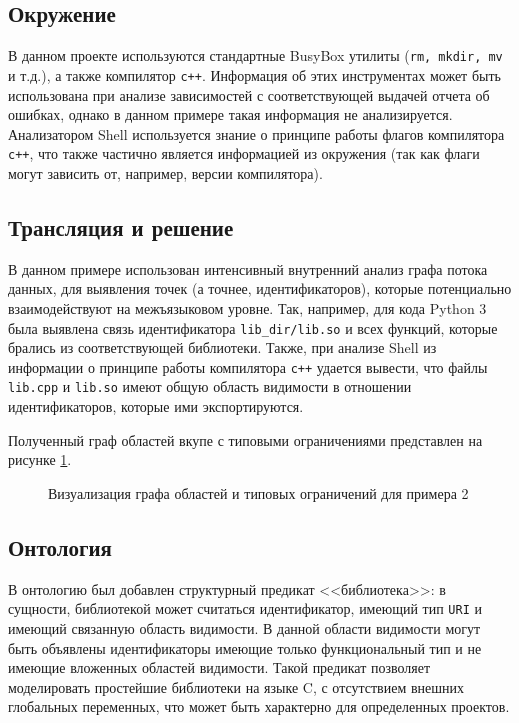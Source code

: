 \subsection{Окружение}

В данном проекте используются стандартные BusyBox утилиты (\texttt{rm, mkdir, mv} и т.д.), а также
компилятор \texttt{c++}. Информация об этих инструментах может быть использована при анализе зависимостей
с соответствующей выдачей отчета об ошибках, однако в данном примере такая информация не анализируется.
Анализатором Shell используется знание о принципе работы флагов компилятора \texttt{c++}, что также частично
является информацией из окружения (так как флаги могут зависить от, например, версии компилятора).

\subsection{Трансляция и решение}

В данном примере использован интенсивный внутренний анализ графа потока данных, для выявления точек (а точнее, идентификаторов), которые
потенциально взаимодействуют на межъязыковом уровне. Так, например, для кода Python 3 была выявлена связь идентификатора \texttt{lib\_dir/lib.so}
и всех функций, которые брались из соответствующей библиотеки. Также, при анализе Shell из информации о принципе работы компилятора \texttt{c++}
удается вывести, что файлы \texttt{lib.cpp} и \texttt{lib.so} имеют общую область видимости в отношении идентификаторов, которые ими экспортируются.

Полученный граф областей вкупе с типовыми ограничениями представлен на рисунке \ref{fig:example_2}.
\begin{figure}[H]
    \centering
    \caption{Визуализация графа областей и типовых ограничений для примера 2}
    \label{fig:example_2}
\end{figure}

\subsection{Онтология}

В онтологию был добавлен структурный предикат <<библиотека>>: в сущности, библиотекой может считаться
идентификатор, имеющий тип \texttt{URI} и имеющий связанную область видимости. В данной области видимости
могут быть объявлены идентификаторы имеющие только функциональный тип и не имеющие вложенных областей видимости.
Такой предикат позволяет моделировать простейшие библиотеки на языке C, с отсутствием внешних глобальных переменных, что
может быть характерно для определенных проектов.


